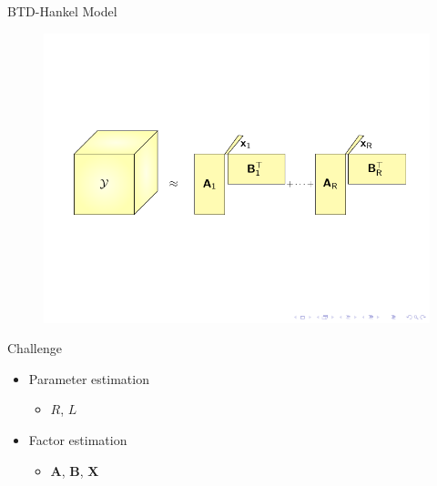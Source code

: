 \documentclass{beamer}
\begin{document}
	\begin{frame}{BTD-Hankel Model}
		
		\vspace{-0.7cm}
		\begin{figure}[htb]
			\centering
			\includegraphics[scale=1.0,clip=true,trim={0.8cm 6.5cm 0.6cm 6.2cm}]{fig/CinC2020/tikz_BTDY.pdf}
		\end{figure}
		\vspace{2.8cm}
		\begin{block}{Challenge}			
				\begin{itemize}
					\item Parameter estimation
					\begin{itemize}
						\item $R$, $L$
					\end{itemize}
					\item Factor estimation
					\begin{itemize}
						\item $\textbf{A}$, $\textbf{B}$, $\textbf{X}$
					\end{itemize}
				\end{itemize}
		\end{block}
	\end{frame}
\end{document}
